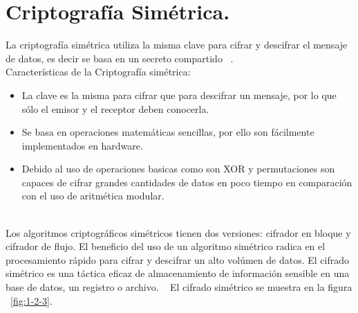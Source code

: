 \section{Criptografía Simétrica. }
La criptografía simétrica utiliza la misma clave para cifrar y descifrar el mensaje de datos, es decir se basa en un secreto compartido  ~\cite{sime}. \\ Características de la Criptografía simétrica: \begin{itemize}
	\item La clave es la misma para cifrar que para descifrar un mensaje, por lo que sólo el emisor y el receptor deben conocerla.
	\item Se basa en operaciones matemáticas sencillas, por ello son fácilmente implementados en hardware.
	\item Debido al uso de operaciones basicas como son XOR y permutaciones son capaces de cifrar grandes cantidades de datos en poco tiempo en comparación con el uso de aritmética modular.
			       \end{itemize} ~\cite{sime} \\
Los algoritmos criptográficos simétricos tienen dos versiones: cifrador en bloque y cifrador de flujo. El beneficio del uso de un algoritmo simétrico radica en el procesamiento rápido para cifrar y descifrar un alto volúmen de datos. El cifrado simétrico es una táctica eficaz de almacenamiento de información sensible en una base de datos, un registro o archivo. ~\cite{sime} 
El cifrado simétrico se muestra en la figura ~\ref{fig:1-2-3}.

